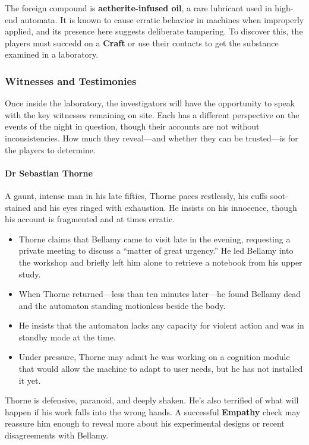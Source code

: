 The foreign compound is \textbf{aetherite-infused oil}, a rare lubricant used in high-end automata. It is known to cause erratic behavior in machines when improperly applied, and its presence here suggests deliberate tampering. To discover this, the players must succedd on a \textbf{Craft}  or use their contacts to get the substance examined in a laboratory.

\subsubsection*{Witnesses and Testimonies}
Once inside the laboratory, the investigators will have the opportunity to speak with the key witnesses remaining on site. Each has a different perspective on the events of the night in question, though their accounts are not without inconsistencies. How much they reveal—and whether they can be trusted—is for the players to determine.

\vspace{\baselineskip}
\paragraph{Dr Sebastian Thorne}
A gaunt, intense man in his late fifties, Thorne paces restlessly, his cuffs soot-stained and his eyes ringed with exhaustion. He insists on his innocence, though his account is fragmented and at times erratic.

\begin{itemize}
    \item Thorne claims that Bellamy came to visit late in the evening, requesting a private meeting to discuss a “matter of great urgency.” He led Bellamy into the workshop and briefly left him alone to retrieve a notebook from his upper study.
    \item When Thorne returned—less than ten minutes later—he found Bellamy dead and the automaton standing motionless beside the body.
    \item He insists that the automaton lacks any capacity for violent action and was in standby mode at the time.
    \item Under pressure, Thorne may admit he was working on a cognition module that would allow the machine to adapt to user needs, but he has not installed it yet.
\end{itemize}

Thorne is defensive, paranoid, and deeply shaken. He’s also terrified of what will happen if his work falls into the wrong hands. A successful \textbf{Empathy}  check may reassure him enough to reveal more about his experimental designs or recent disagreements with Bellamy.




